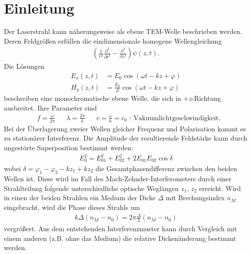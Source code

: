 \section{Einleitung}

Der Laserstrahl kann näherungsweise als ebene TEM-Welle beschrieben werden. Deren Feldgrößen erfüllen die eindimensionale homogene Wellengleichung
	\begin{align*}
	\left(\frac{1}{v^2}\frac{\partial^2}{\partial t^2} - \frac{\partial^2}{\partial z^2}\right)\psi(z,t).
	\end{align*}
Die Lösungen
	\begin{align*}
	E_x(z,t) &=E_{0}\cos(\omega t - kz + \varphi)\\
	H_y(z,t) &=\frac{E_{0}}{Z}\cos(\omega t - kz + \varphi)
	\end{align*}
beschreiben eine monochromatische ebene Welle, die sich in $+z$-Richtung ausbreitet. Ihre Parameter sind
	\begin{align*}
	& f=\frac{\omega}{2\pi} &&\lambda=\frac{2\pi}{k} && v = \frac{\omega}{k} = c_0 \mbox{ : Vakuumlichtgeschwindigkeit.}
	\end{align*}
Bei der Überlagerung zweier Wellen gleicher Frequenz und Polarisation kommt es zu stationärer Interferenz. Die Amplitude der resultierende Feldstärke kann durch ungestörte Superposition bestimmt werden:
	\begin{align*}
	E_0^2 = E_{01}^2+ E_{02}^2 + 2 E_{01} E_{02} \cos\delta
	\end{align*}
wobei $\delta = \varphi_1-\varphi_2 - kz_1 + kz_2$ die Gesamtphasendifferenz zwischen den beiden Wellen ist. Diese wird im Fall des Mach-Zehnder-Interferometers durch einer Strahlteilung folgende unterschiedliche optische Weglängen $z_1$, $z_2$ erreicht. Wird in einen der beiden Strahlen ein Medium der Dicke $\Delta$ mit Brechungsindex $n_M$ eingebracht, wird die Phase dieses Strahls um 
	\begin{align*}
	k\Delta(n_M - n_0) = 2\pi\frac{\Delta}{\lambda}(n_M-n_0)
	\end{align*}
vergrößert. Aus dem entstehenden Interferenzmuster kann durch Vergleich mit einem anderen (z.B. ohne das Medium) die relative Dickenänderung bestimmt werden.